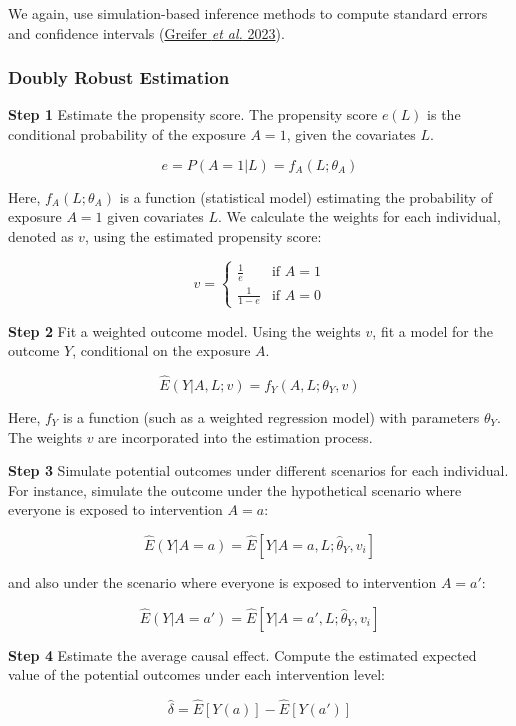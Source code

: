 \documentclass[
  singlecolumn]{article}
\begin{document}
We again, use simulation-based inference methods to compute standard
errors and confidence intervals (\hyperref[ref-greifer2023]{Greifer
\emph{et al.} 2023}).

\subsubsection{Doubly Robust Estimation}\label{doubly-robust-estimation}

\textbf{Step 1} Estimate the propensity score. The propensity score
\(e(L)\) is the conditional probability of the exposure \(A = 1\), given
the covariates \(L\).

\[e = P(A = 1 | L) = f_A(L; \theta_A)\]

Here, \(f_A(L; \theta_A)\) is a function (statistical model) estimating
the probability of exposure \(A = 1\) given covariates \(L\). We
calculate the weights for each individual, denoted as \(v\), using the
estimated propensity score:

\[
v = 
\begin{cases} 
\frac{1}{e} & \text{if } A = 1 \\
\frac{1}{1-e} & \text{if } A = 0 
\end{cases}
\]

\textbf{Step 2} Fit a weighted outcome model. Using the weights \(v\),
fit a model for the outcome \(Y\), conditional on the exposure \(A\).

\[ \hat{E}(Y|A, L; v) = f_Y(A, L ; \theta_Y, v) \]

Here, \(f_Y\) is a function (such as a weighted regression model) with
parameters \(\theta_Y\). The weights \(v\) are incorporated into the
estimation process.

\textbf{Step 3} Simulate potential outcomes under different scenarios
for each individual. For instance, simulate the outcome under the
hypothetical scenario where everyone is exposed to intervention \(A=a\):

\[\hat{E}(Y|A=a)  = \hat{E}[Y|A=a,L; \hat{\theta}_Y, v_i]\]

and also under the scenario where everyone is exposed to intervention
\(A=a'\):

\[\hat{E}(Y|A=a')  = \hat{E}[Y|A=a',L; \hat{\theta}_Y, v_i]\]

\textbf{Step 4} Estimate the average causal effect. Compute the
estimated expected value of the potential outcomes under each
intervention level:

\[\hat{\delta} = \hat{E}[Y(a)] - \hat{E}[Y(a')]\]
\end{document}
